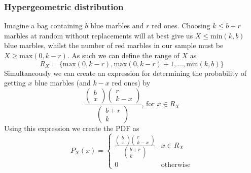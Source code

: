 \subsubsection{Hypergeometric distribution}
Imagine a bag containing $b$ blue marbles and $r$ red ones. Choosing $k\leq b+r$ marbles at random without replacements will at best give us $X\leq \text{min}(k,b)$ blue marbles, whilst the number of red marbles in our sample must be $X\geq \text{max}(0,k-r)$. As such we can define the range of $X$ as
\[
    R_X=\{\text{max}(0,k-r),\text{max}(0,k-r)+1,\ldots,\text{min}(k,b)\}
\]
Simultaneously we can create an expression for determining the probability of getting $x$ blue marbles (and $k-x$ red ones) by
\[
    \frac{\begin{pmatrix}b\\x\end{pmatrix}\begin{pmatrix}r\\k-x\end{pmatrix}}{\begin{pmatrix}b+r\\k\end{pmatrix}} \text{, for } x\in R_X
\]
Using this expression we create the PDF as
\[
    P_{X}(x)=\begin{cases}\frac{\begin{pmatrix}b\\x\end{pmatrix}\begin{pmatrix}r\\k-x\end{pmatrix}}{\begin{pmatrix}b+r\\k\end{pmatrix}} & x\in R_X \\ 0 & \text{otherwise}\end{cases}
\]

